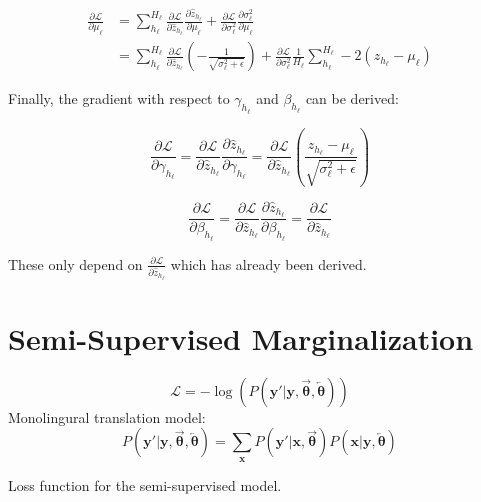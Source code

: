 \begin{equation}
\begin{aligned}
\frac{\partial \mathcal{L}}{\partial \mu_\ell} &= \sum_{h_\ell}^{H_\ell} \frac{\partial \mathcal{L}}{\partial \hat{z}_{h_\ell}} \frac{\partial \hat{z}_{h_\ell}}{\partial \mu_\ell} + \frac{\partial \mathcal{L}}{\partial \sigma_{\ell}^2} \frac{\partial \sigma_\ell^2}{\partial \mu_\ell} \\
&= \sum_{h_\ell}^{H_\ell} \frac{\partial \mathcal{L}}{\partial \hat{z}_{h_\ell}} \left(- \frac{1}{\sqrt{\sigma_\ell^2 + \epsilon}}\right) + \frac{\partial \mathcal{L}}{\partial \sigma_{\ell}^2} \frac{1}{H_\ell} \sum_{h_\ell}^{H_\ell} -2 \left(z_{h_\ell} - \mu_\ell\right)
\end{aligned}
\end{equation}

Finally, the gradient with respect to $\gamma_{h_\ell}$ and $\beta_{h_\ell}$ can be derived:

\begin{equation}
\frac{\partial \mathcal{L}}{\partial \gamma_{h_\ell}} = \frac{\partial \mathcal{L}}{\partial \hat{z}_{h_\ell}} \frac{\partial \hat{z}_{h_\ell}}{\partial \gamma_{h_\ell}} = \frac{\partial \mathcal{L}}{\partial \hat{z}_{h_\ell}} \left(\frac{z_{h_\ell} - \mu_\ell}{\sqrt{\sigma_\ell^2 + \epsilon}}\right)
\end{equation}

\begin{equation}
\frac{\partial \mathcal{L}}{\partial \beta_{h_\ell}} = \frac{\partial \mathcal{L}}{\partial \hat{z}_{h_\ell}} \frac{\partial \hat{z}_{h_\ell}}{\partial \beta_{h_\ell}} = \frac{\partial \mathcal{L}}{\partial \hat{z}_{h_\ell}}
\end{equation}

These only depend on $\frac{\partial \mathcal{L}}{\partial \hat{z}_{h_\ell}}$ which has already been derived.

\section{Semi-Supervised Marginalization}
\label{appendix:backward-pass:semi-sum}

\begin{equationbox}[H]
\begin{equation*}
\mathcal{L} = -\log(P(\mathbf{y}'|\mathbf{y}, \overrightarrow{\boldsymbol\theta}, \overleftarrow{\boldsymbol\theta}))
\end{equation*}
Monolingural translation model:
\begin{equation*}
P(\mathbf{y}'|\mathbf{y}, \overrightarrow{\boldsymbol\theta}, \overleftarrow{\boldsymbol\theta}) = \sum_{\mathbf{x}} P(\mathbf{y}'|\mathbf{x}, \overrightarrow{\boldsymbol\theta}) P(\mathbf{x}|\mathbf{y}, \overleftarrow{\boldsymbol\theta})
\end{equation*}
\caption{Loss function for the semi-supervised model.}
\end{equationbox}

